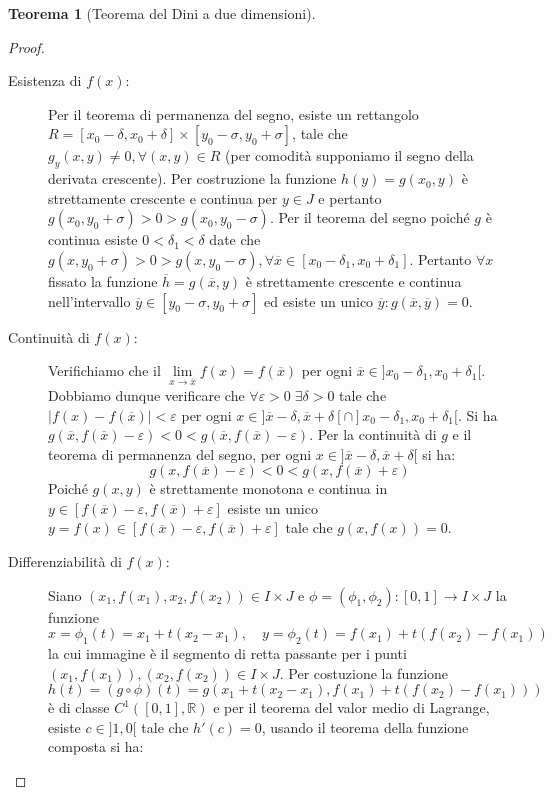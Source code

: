 \documentclass[leqno]{article}
\theoremstyle{definition}
\numberwithin{equation}{section}
\newtheorem{theorem}{Teorema}[section]
\theoremstyle{remark}
\begin{document}
\begin{theorem}[Teorema del Dini a due dimensioni]
\begin{proof}
\begin{description}
				\item [Esistenza di $f(x)$:] Per il teorema di permanenza del segno, esiste un rettangolo $R=[x_0-\delta,x_0+\delta]\times [y_0-\sigma, y_0+\sigma]$, tale che $g_y(x,y)\neq0, \forall(x,y)\in R$ (per comodità supponiamo il segno della derivata crescente). Per costruzione la funzione $h(y)=g(x_0,y)$ è strettamente crescente e continua per $y \in J$ e pertanto $g(x_0,y_0+\sigma)>0>g(x_0,y_0-\sigma)$. Per il teorema del segno poiché $g$ è continua esiste $0<\delta_1<\delta$ date che $g(x,y_0+\sigma)>0>g(x,y_0-\sigma), \forall \overline{x} \in [x_0-\delta_1,x_0+\delta_1]$. Pertanto $\forall x$ fissato la funzione $\overline{h}=g(\overline{x},y)$ è strettamente crescente e continua nell'intervallo $\overline{y}\in [y_0-\sigma, y_0+\sigma]$ ed esiste un unico $\overline{y}: g(\overline{x},\overline{y})=0$.
				\item[Continuità di $f(x)$:] Verifichiamo che il $\lim\limits_{x\to \overline{x}}f(x)=f(\overline{x})$ per ogni $\overline{x}\in]x_0-\delta_1,x_0+\delta_1[$. Dobbiamo dunque verificare che $\forall \varepsilon >0 \; \exists \delta > 0$ tale che $|f(x)-f(\overline{x})|<\varepsilon$ per ogni $x\in ]\overline{x}-\delta,\overline{x}+\delta[\cap]x_0-\delta_1,x_0+\delta_1[$. Si ha $g(\overline{x}, f(\overline{x})-\varepsilon)<0<g(\overline{x}, f(\overline{x})-\varepsilon)$. Per la continuità di $g$ e il teorema di permanenza del segno, per ogni $x\in ]\overline{x}-\delta,\overline{x}+\delta[$ si ha:
				\begin{equation}
					g(x,f(\overline{x})-\varepsilon)< 0 < g(x,f(\overline{x})+\varepsilon)
				\end{equation}
				Poiché $g(x,y)$ è strettamente monotona e continua in $y\in [f(\overline{x})-\varepsilon, f(\overline{x})+\varepsilon]$ esiste un unico $y=f(x)\in[f(\overline{x})-\varepsilon, f(\overline{x})+\varepsilon]$ tale che $g(x,f(x))=0$.
				\item[Differenziabilità di $f(x)$:] Siano $(x_1,f(x_1),x_2,f(x_2))\in I \times J$ e $\phi=(\phi_1,\phi_2):[0,1]\rightarrow I\times J$ la funzione 
				\[x=\phi_1(t)=x_1+ t(x_2-x_1), \quad y=\phi_2(t)=f(x_1)+t(f(x_2)-f(x_1)) \]
				la cui immagine è il segmento di retta passante per i punti $(x_1,f(x_1)),(x_2,f(x_2))\in I\times J$. Per costuzione la funzione 
				\begin{equation}
					h(t)=(g\circ \phi)(t)=g(x_1+ t(x_2-x_1),f(x_1)+t(f(x_2)-f(x_1)))
				\end{equation}
				è di classe $C^1([0,1],\mathbb{R})$ e per il teorema del valor medio di Lagrange, esiste $c\in]1,0[$ tale che $h'(c)=0$, usando il teorema della funzione composta si ha:

\end{description}
\end{proof}
\end{theorem}
\end{document}
